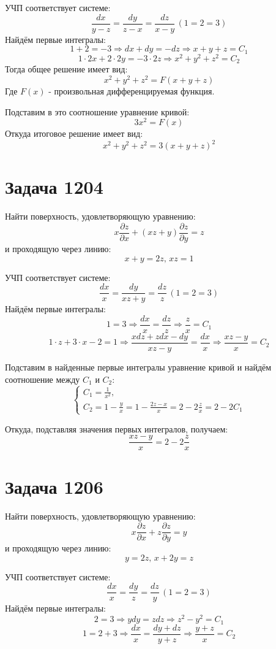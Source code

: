 \documentclass[11pt]{article}
\begin{document}
УЧП соответствует системе:
$$\frac{dx}{y - z} = \frac{dy}{z - x} = \frac{dz}{x - y}\, (1 = 2 = 3)$$
Найдём первые интегралы:
$$1 + 2 = -3 \Rightarrow dx + dy = -dz \Rightarrow x + y + z = C_1$$
$$1 \cdot 2x + 2 \cdot 2y = -3 \cdot 2z \Rightarrow x^2 + y^2 + z^2 = C_2$$
Тогда общее решение имеет вид:
$$x^2 + y^2 + z^2 = F(x + y + z)$$
Где \(F(x)\) - произвольная дифференцируемая функция.

Подставим в это соотношение уравнение кривой:
$$3x^2 = F(x)$$
Откуда итоговое решение имеет вид:
$$x^2 + y^2 + z^2 = 3(x + y + z)^2$$

\section{Задача 1204}
\label{sec:org164d5fd}
Найти поверхность, удовлетворяющую уравнению:
$$x\frac{\partial{z}}{\partial{x}} + (xz + y)\frac{\partial{z}}{\partial{y}} = z$$
и проходящую через линию:
$$x + y = 2z,\, xz = 1$$

УЧП соответствует системе:
$$\frac{dx}{x} = \frac{dy}{xz + y} = \frac{dz}{z}\, (1 = 2 = 3)$$
Найдём первые интегралы:
$$1 = 3 \Rightarrow \frac{dx}{x} = \frac{dz}{z} \Rightarrow \frac{z}{x} = C_1$$
$$1 \cdot z + 3 \cdot x - 2 = 1 \Rightarrow \frac{xdz + zdx - dy}{xz - y} = \frac{dx}{x} \Rightarrow \frac{xz - y}{x} = C_2$$

Подставим в найденные первые интегралы уравнение кривой и найдём соотношение между \(C_1\) и \(C_2\):
\begin{equation*}
  \begin{cases}
    C_1 = \frac{1}{x^2},\\
    C_2 = 1 - \frac{y}{x} = 1 - \frac{2z - x}{x} = 2 - 2\frac{z}{x} = 2 - 2C_1
  \end{cases}
\end{equation*}

Откуда, подставляя значения первых интегралов, получаем:
$$\frac{xz - y}{x} = 2 - 2\frac{z}{x}$$

\section{Задача 1206}
\label{sec:org8aa05d6}
Найти поверхность, удовлетворяющую уравнению:
$$x\frac{\partial{z}}{\partial{x}} + z\frac{\partial{z}}{\partial{y}} = y$$
и проходящую через линию:
$$y = 2z,\, x + 2y = z$$

УЧП соответствует системе:
$$\frac{dx}{x} = \frac{dy}{z} = \frac{dz}{y}\, (1 = 2 = 3)$$
Найдём первые интегралы:
$$2 = 3 \Rightarrow ydy = zdz \Rightarrow z^2 - y^2 = C_1$$
$$1 = 2 + 3 \Rightarrow \frac{dx}{x} = \frac{dy + dz}{y + z} \Rightarrow \frac{y + z}{x} = C_2$$
\end{document}
